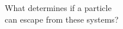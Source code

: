 \documentclass[preview]{standalone}
\begin{document}
What determines if a particle\\ can escape from these systems?\\
\end{document}
